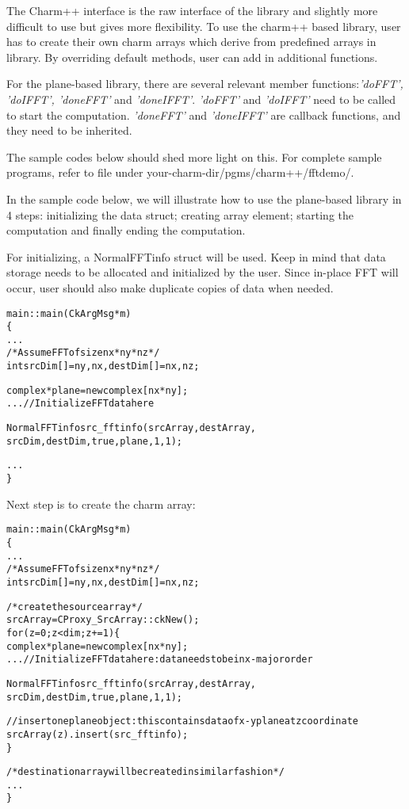The Charm++ interface is the raw interface of the library and slightly
more difficult to use but gives more flexibility. To use the charm++
based library, user has to create their own charm arrays which derive
from predefined arrays in library. By overriding default methods, user
can add in additional functions.


For the plane-based library, there are several relevant member
functions:{\it 'doFFT', 'doIFFT', 'doneFFT'} and {\it
'doneIFFT'}. {\it 'doFFT'} and {\it 'doIFFT'} need to be called to
start the computation. {\it 'doneFFT'} and {\it 'doneIFFT'} are
callback functions, and they need to be inherited.

The sample codes below should shed more light on this. For complete
sample programs, refer to file under
your-charm-dir/pgms/charm++/fftdemo/.

In the sample code below, we will illustrate how to use the
plane-based library in 4 steps: initializing the data struct;
creating array element; starting the computation and finally ending
the computation.

For initializing, a NormalFFTinfo struct will be used. Keep in mind
that data storage needs to be allocated and initialized by the
user. Since in-place FFT will occur, user should also make duplicate
copies of data when needed.
\begin{alltt}
    main::main(CkArgMsg *m)
    \{
         ...
         /* Assume FFT of size  nx*ny*nz */
         int srcDim[] = {ny, nx}, destDim[] = {nx, nz};

         complex *plane =  new complex[nx*ny];
         ... // Initialize FFT data here 

         NormalFFTinfo src_fftinfo(srcArray, destArray, 
                                   srcDim, destDim, true, plane, 1, 1);

         ...
     \}
\end{alltt}

Next step is to create the charm array: 
\begin{alltt}
     main::main(CkArgMsg *m)
     \{
          ...
          /* Assume FFT of size  nx*ny*nz */
          int srcDim[] = {ny, nx}, destDim[] = {nx, nz};

          /* create the source array */
          srcArray = CProxy_SrcArray::ckNew();
          for (z = 0; z < dim; z+=1) \{
              complex *plane =  new complex[nx*ny];
              ... // Initialize FFT data here: data needs to be in x-major order 

              NormalFFTinfo src_fftinfo(srcArray, destArray, 
                                       srcDim, destDim, true, plane, 1, 1);

              // insert one plane object: this contains data of x-y plane at z coordinate	      
              srcArray(z).insert(src_fftinfo);  
           \}

          /* destination array will be created in similar fashion */
          ...
      \}
\end{alltt}

